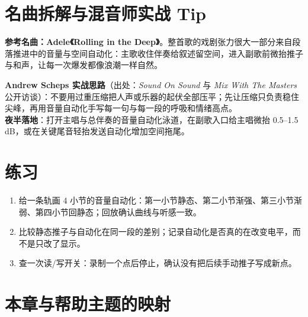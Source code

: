 \section{名曲拆解与混音师实战 Tip}

\textbf{参考名曲：Adele《Rolling in the Deep》}。整首歌的戏剧张力很大一部分来自段落推进中的音量与空间自动化：主歌收住伴奏给叙述留空间，进入副歌前微抬推子与和声，让每一次爆发都像浪潮一样自然。

\begin{tipbox}
\textbf{Andrew Scheps 实战思路}（出处：\emph{Sound On Sound} 与 \emph{Mix With The Masters} 公开访谈）：不要用过重压缩把人声或乐器的起伏全部压平；先让压缩只负责稳住尖峰，再用音量自动化手写每一句与每一段的呼吸和情绪高点。\\
\textbf{夜半落地}：打开主唱与总伴奏的音量自动化泳道，在副歌入口给主唱微抬 0.5--1.5 dB，或在关键尾音轻抬发送自动化增加空间拖尾。
\end{tipbox}

\section{练习}


\begin{exercise}
\begin{enumerate}
  \item 给一条轨画 4 小节的音量自动化：第一小节静态、第二小节渐强、第三小节渐弱、第四小节回静态；回放确认曲线与听感一致。
  \item 比较静态推子与自动化在同一段的差别；记录自动化是否真的在改变电平，而不是只改了显示。
  \item 查一次读/写开关：录制一个点后停止，确认没有把后续手动推子写成新点。
\end{enumerate}
\end{exercise}

\section{本章与帮助主题的映射}

